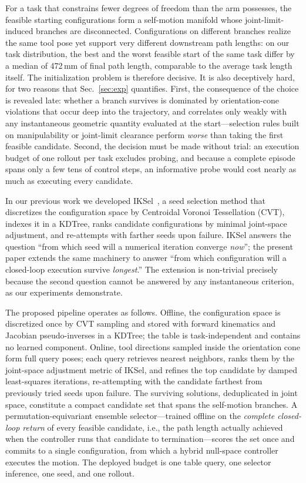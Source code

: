 \documentclass[journal]{IEEEtran}
\begin{document}
For a task that constrains fewer degrees of freedom than the arm
possesses, the feasible starting configurations form a self-motion
manifold whose joint-limit-induced branches are disconnected.
Configurations on different branches realize the same tool pose yet
support very different downstream path lengths: on our task
distribution, the best and the worst feasible start of the same task
differ by a median of 472\,mm of final path length, comparable to the
average task length itself. The initialization problem is therefore
decisive. It is also deceptively hard, for two reasons that
Sec.~\ref{sec:exp} quantifies. First, the consequence of the choice is
revealed late: whether a branch survives is dominated by
orientation-cone violations that occur deep into the trajectory, and
correlates only weakly with any instantaneous geometric quantity
evaluated at the start---selection rules built on manipulability or
joint-limit clearance perform \textit{worse} than taking the first
feasible candidate. Second, the decision must be made without trial: an
execution budget of one rollout per task excludes probing, and because a
complete episode spans only a few tens of control steps, an informative
probe would cost nearly as much as executing every candidate.

In our previous work we developed IKSel~\cite{yuan2026iksel}, a seed
selection method that discretizes the configuration space by Centroidal
Voronoi Tessellation (CVT), indexes it in a KDTree, ranks candidate
configurations by minimal joint-space adjustment, and re-attempts with
farther seeds upon failure. IKSel answers the question ``from which seed
will a numerical iteration converge \textit{now}''; the present paper
extends the same machinery to answer ``from which configuration will a
closed-loop execution survive \textit{longest}.'' The extension is
non-trivial precisely because the second question cannot be answered by
any instantaneous criterion, as our experiments demonstrate.

The proposed pipeline operates as follows. Offline, the configuration
space is discretized once by CVT sampling and stored with forward
kinematics and Jacobian pseudo-inverses in a KDTree; the table is
task-independent and contains no learned component. Online, tool
directions sampled inside the orientation cone form full query poses;
each query retrieves nearest neighbors, ranks them by the joint-space
adjustment metric of IKSel, and refines the top candidate by damped
least-squares iterations, re-attempting with the candidate farthest from
previously tried seeds upon failure. The surviving solutions,
deduplicated in joint space, constitute a compact candidate set that
spans the self-motion branches. A permutation-equivariant ensemble
selector---trained offline on the \textit{complete closed-loop return}
of every feasible candidate, i.e., the path length actually achieved
when the controller runs that candidate to termination---scores the set
once and commits to a single configuration, from which a hybrid
null-space controller executes the motion. The deployed budget is one
table query, one selector inference, one seed, and one rollout.
\end{document}
